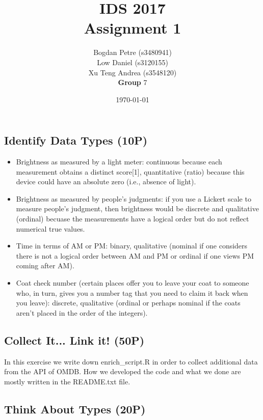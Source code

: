 \documentclass[a4paper]{article}
\title{IDS 2017 \\Assignment 1}
\author{
 Bogdan Petre (s3480941) \\ 
 Low Daniel (s3120155) \\
 Xu Teng Andrea (s3548120) 
 \\ \textbf{Group} 7}
\date{\today}
\begin{document}
\maketitle
\section{}
\subsection{Identify Data Types (10P)}

	\begin{itemize}
		\item Brightness as measured by a light meter: continuous because each measurement obtains a distinct score[1], quantitative (ratio) because this device could have an absolute zero (i.e., absence of light). 
		
		\item Brightness as measured by people’s judgments: if you use a Lickert scale to measure people’s judgment, then brightness would be discrete and qualitative (ordinal) becuase the measurements have a logical order but do not reflect numerical true values.  
		
		\item Time in terms of AM or PM: binary, qualitative (nominal if one considers there is not a logical order between AM and PM or ordinal if one views PM coming after AM).
		
		\item Coat check number (certain places offer you to leave your coat to someone who, in turn, gives
		you a number tag that you need to claim it back when you leave): discrete, qualitative (ordinal or perhaps nominal if the coats aren’t placed in the order of the integers).
	\end{itemize}

	\subsection{Collect It... Link it! (50P)}
	
	In this exercise we write down enrich\_script.R in order to collect additional data from the API of OMDB. How we developed the code and what we done are mostly written in the README.txt file.
	
	\subsection{Think About Types (20P)}
	
\end{document}
